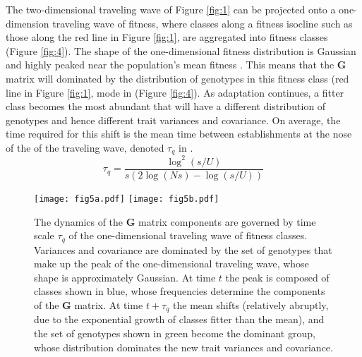 \documentclass[9pt,twocolumn,twoside]{gsajnl}
\newcommand{\G}{\textbf{G }}
\begin{document}
The two-dimensional traveling wave of Figure \ref{fig:1} can be projected onto a one-dimension traveling wave of fitness, where classes along a fitness isocline such as those along the red line in Figure \ref{fig:1}, are aggregated into fitness classes (Figure \ref{fig:4}). The shape of the one-dimensional fitness distribution is Gaussian and highly peaked near the population's mean fitness \citep{desai2007beneficial}. This means that the \G matrix will dominated by the distribution of genotypes in this fitness class (red line in Figure \ref{fig:1}, mode in (Figure \ref{fig:4}). As adaptation continues, a fitter class becomes the most abundant that will have a different distribution of genotypes and hence different trait variances and covariance. On average, the time required for this shift is the mean time between establishments at the nose of the of the traveling wave, denoted $\tau_q$ in \citet{desai2007beneficial}.
\begin{equation}\label{eq:8}
\tau_q = \frac{\log^2(s/U)}{s(2\log(Ns)-\log(s/U))}
\end{equation}

\begin{figure}[!ht]
\texttt{[image: fig5a.pdf]}
\texttt{[image: fig5b.pdf]}
\caption{The dynamics of the \G matrix components are governed by time scale $\tau_q$ of the one-dimensional traveling wave of fitness classes. Variances and covariance are dominated by the set of genotypes that make up the peak of the one-dimensional traveling wave, whose shape is approximately Gaussian. At time $t$ the peak is composed of classes shown in blue, whose frequencies determine the components of the \G  matrix. At time $t+\tau_q$ the mean shifts (relatively abruptly, due to the exponential growth of classes fitter than the mean), and the set of genotypes shown in green become the dominant group, whose distribution dominates the new trait variances and covariance.}\label{fig:5}
% 
% 
\end{figure}
\end{document}
